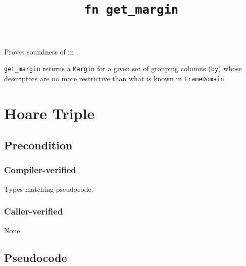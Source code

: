 \documentclass{article}
\title{\texttt{fn get\_margin}}
\author{\MichaelShoemateAuthor}
\date{}
\begin{document}
\maketitle

\contrib
Proves soundness of  in .

\texttt{get\_margin} returns a \texttt{Margin} for a given set of grouping columns (\texttt{by})
whose descriptors are no more restrictive than what is known in \texttt{FrameDomain}.

\section{Hoare Triple}
\subsection*{Precondition}
\subsubsection*{Compiler-verified}
Types matching pseudocode.

\subsubsection*{Caller-verified}
None

\subsection*{Pseudocode}

\end{document}

